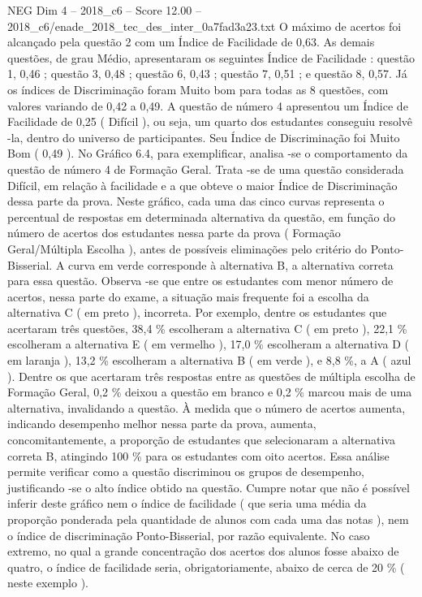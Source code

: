 \begin{textsample}{NEG Dim 4 – 2018\_c6 – Score 12.00 – 2018\_c6/enade\_2018\_tec\_des\_inter\_0a7fad3a23.txt}
O máximo de acertos foi alcançado pela questão 2 com um Índice de Facilidade de 0,63.
As demais questões, de grau Médio, apresentaram os seguintes Índice de Facilidade : questão 1, 0,46 ; questão 3, 0,48 ; questão 6, 0,43 ; questão 7, 0,51 ; e questão 8, 0,57.
Já os índices de Discriminação foram Muito bom para todas as 8 questões, com valores variando de 0,42 a 0,49.
A questão de número 4 apresentou um Índice de Facilidade de 0,25 ( Difícil ), ou seja, um quarto dos estudantes conseguiu resolvê -la, dentro do universo de participantes.
Seu Índice de Discriminação foi Muito Bom ( 0,49 ).
No Gráfico 6.4, para exemplificar, analisa -se o comportamento da questão de número 4 de Formação Geral.
Trata -se de uma questão considerada Difícil, em relação à facilidade e a que obteve o maior Índice de Discriminação dessa parte da prova.
Neste gráfico, cada uma das cinco curvas representa o percentual de respostas em determinada alternativa da questão, em função do número de acertos dos estudantes nessa parte da prova ( Formação Geral/Múltipla Escolha ), antes de possíveis eliminações pelo critério do Ponto-Bisserial.
A curva em verde corresponde à alternativa B, a alternativa correta para essa questão.
Observa -se que entre os estudantes com menor número de acertos, nessa parte do exame, a situação mais frequente foi a escolha da alternativa C ( em preto ), incorreta.
Por exemplo, dentre os estudantes que acertaram três questões, 38,4 \% escolheram a alternativa C ( em preto ), 22,1 \% escolheram a alternativa E ( em vermelho ), 17,0 \% escolheram a alternativa D ( em laranja ), 13,2 \% escolheram a alternativa B ( em verde ), e 8,8 \%, a A ( azul ).
Dentre os que acertaram três respostas entre as questões de múltipla escolha de Formação Geral, 0,2 \% deixou a questão em branco e 0,2 \% marcou mais de uma alternativa, invalidando a questão.
À medida que o número de acertos aumenta, indicando desempenho melhor nessa parte da prova, aumenta, concomitantemente, a proporção de estudantes que selecionaram a alternativa correta B, atingindo 100 \% para os estudantes com oito acertos.
Essa análise permite verificar como a questão discriminou os grupos de desempenho, justificando -se o alto índice obtido na questão.
Cumpre notar que não é possível inferir deste gráfico nem o índice de facilidade ( que seria uma média da proporção ponderada pela quantidade de alunos com cada uma das notas ), nem o índice de discriminação Ponto-Bisserial, por razão equivalente.
No caso extremo, no qual a grande concentração dos acertos dos alunos fosse abaixo de quatro, o índice de facilidade seria, obrigatoriamente, abaixo de cerca de 20 \% ( neste exemplo ).

\end{textsample}

